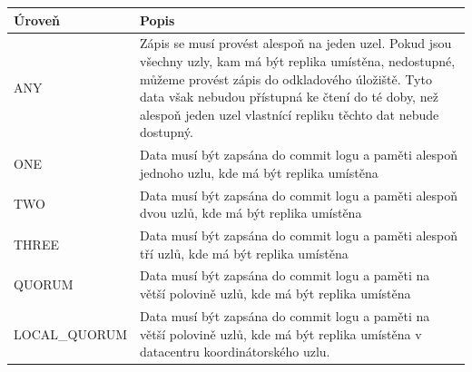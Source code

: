 \begin{table}
\begin{tabularx}{\textwidth}{ |l|X| }

    \hline
    Úroveň       & Popis                                                                                                                                                                                                                                                                                  \\ \hline
    ANY          & Zápis se musí provést alespoň na jeden uzel. Pokud jsou všechny uzly, kam má být replika umístěna, nedostupné, můžeme provést zápis do odkladového úložiště. Tyto data však nebudou přístupná ke čtení do té doby, než alespoň jeden uzel vlastnící repliku těchto dat nebude dostupný. \\ \hline
    ONE          & Data musí být zapsána do commit logu a paměti alespoň jednoho uzlu, kde má být replika umístěna                                                                                                                                                                                        \\ \hline
    TWO          & Data musí být zapsána do commit logu a paměti alespoň dvou uzlů, kde má být replika umístěna                                                                                                                                                                                           \\ \hline
    THREE        & Data musí být zapsána do commit logu a paměti alespoň tří uzlů, kde má být replika umístěna                                                                                                                                                                                            \\ \hline
    QUORUM       & Data musí být zapsána do commit logu a paměti na větší polovině uzlů, kde má být replika umístěna                                                                                                                                                                                      \\ \hline
    LOCAL\_QUORUM & Data musí být zapsána do commit logu a paměti na větší polovině uzlů, kde má být replika umístěna v datacentru koordinátorského uzlu.                                                                                                                                                   \\ \hline

\end{tabularx}
\end{table}
